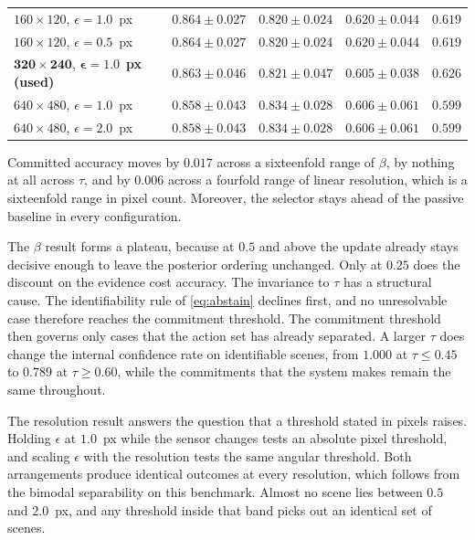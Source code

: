 \documentclass{article} %
\theoremstyle{defstyle}
\theoremstyle{plain}
\begin{document}
\begin{table}[htb]
\begin{center}
\begin{tabular}{lcccc}
$160 \times 120$, $\epsilon = 1.0$~px & $0.864 \pm 0.027$ & $0.820 \pm 0.024$ & $0.620 \pm 0.044$ & $0.619$ \\
$160 \times 120$, $\epsilon = 0.5$~px & $0.864 \pm 0.027$ & $0.820 \pm 0.024$ & $0.620 \pm 0.044$ & $0.619$ \\
$\mathbf{320 \times 240}$, $\boldsymbol{\epsilon = 1.0}$~\textbf{px (used)} & $\mathbf{0.863 \pm 0.046}$ & $0.821 \pm 0.047$ & $0.605 \pm 0.038$ & $0.626$ \\
$640 \times 480$, $\epsilon = 1.0$~px & $0.858 \pm 0.043$ & $0.834 \pm 0.028$ & $0.606 \pm 0.061$ & $0.599$ \\
$640 \times 480$, $\epsilon = 2.0$~px & $0.858 \pm 0.043$ & $0.834 \pm 0.028$ & $0.606 \pm 0.061$ & $0.599$ \\
\bottomrule
\end{tabular}
\end{center}
\end{table}

Committed accuracy moves by $0.017$ across a sixteenfold range of $\beta$, by nothing
at all across $\tau$, and by $0.006$ across a fourfold range of linear resolution,
which is a sixteenfold range in pixel count. Moreover, the selector stays ahead of the passive baseline in every configuration.

The $\beta$ result forms a plateau, because at $0.5$ and above the update already stays
decisive enough to leave the posterior ordering unchanged. Only at $0.25$ does the discount on
the evidence cost accuracy. The invariance to $\tau$ has a structural cause. The
identifiability rule of \eqref{eq:abstain} declines first, and no unresolvable case therefore
reaches the commitment threshold. The commitment threshold then governs only cases that the
action set has already separated. A larger $\tau$ does change the internal confidence rate on
identifiable scenes, from $1.000$ at $\tau \leq 0.45$ to $0.789$ at $\tau \geq 0.60$, while the
commitments that the system makes remain the same throughout.

The resolution result answers the question that a threshold stated in pixels raises. Holding
$\epsilon$ at $1.0$~px while the sensor changes tests an absolute pixel threshold, and scaling
$\epsilon$ with the resolution tests the same angular threshold. Both arrangements produce
identical outcomes at every resolution, which follows from the bimodal separability on this
benchmark. Almost no scene lies between $0.5$ and $2.0$~px, and any threshold inside that band
picks out an identical set of scenes.
\end{document}
